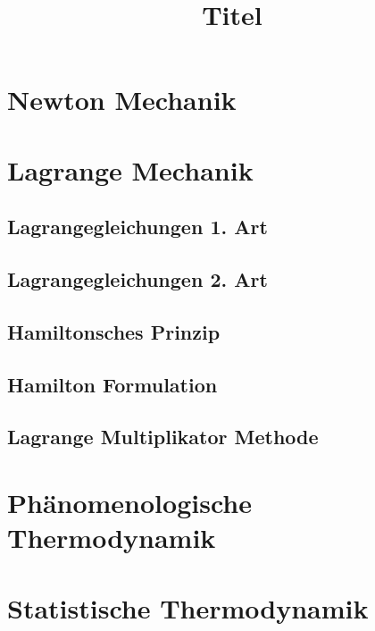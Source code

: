\documentclass[fourColumns]{formularyETH/formularyETH}
\title{Titel}
\begin{document}
\section{Newton Mechanik}
	
	\label{sec:newtonMechanik}
\section{Lagrange Mechanik}
\label{sec:LagrangeMechanik}
  \subsection{Lagrangegleichungen 1. Art}
  \label{subsec:Lagrangegleichungen1Art}
  
  \subsection{Lagrangegleichungen 2. Art}
  \label{subsec:Lagrangegleichungen2Art}
  
  \subsection{Hamiltonsches Prinzip}
  \label{subsec:hamiltonPrinciple}
  
  \subsection{Hamilton Formulation}
  \label{subsec:hamiltonFormulation}
  
  \subsection{Lagrange Multiplikator Methode}
  \label{subsec:LagrangeMultiplikator}
  
\newpage
\section{Phänomenologische Thermodynamik}

\newpage
\section{Statistische Thermodynamik}
\label{sec:STT}

	\vfill\columnbreak




	\vfill\columnbreak


	\vfill\columnbreak

\newpage
\end{document}
